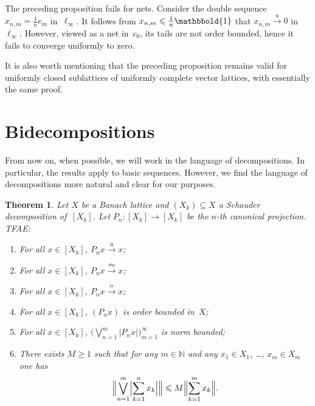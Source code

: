 \documentclass[12pt]{amsart}
\theoremstyle{plain}
\newtheorem{theorem}{Theorem}[section]
\theoremstyle{definition}
\newcommand{\abs}[1]{\lvert#1\rvert}
\newcommand{\Bigabs}[1]{\Bigl\lvert#1\Bigr\rvert}
\newcommand{\Bignorm}[1]{\Bigl\lVert#1\Bigr\rVert}
\newcommand{\goeso}{\xrightarrow{\mathrm{o}}}	%
\newcommand{\goesso}{\xrightarrow{\sigma\mathrm{o}}}	%
\newcommand{\goesu}{\xrightarrow{\mathrm{u}}} %
\def\one{\mathbbold{1}}
\renewcommand{\le}{\leqslant}
\renewcommand{\ge}{\geqslant}
\begin{document}
The preceding proposition fails for nets. Consider the double sequence
$x_{n,m}=\frac1n e_m$ in~$\ell_\infty$. It follows from
$x_{n,m}\le\frac1n\one$ that $x_{n,m}\goesu 0$
in~$\ell_\infty$. However, viewed as a net in~$c_0$, its tails are not
order bounded, hence it fails to converge uniformly to zero.

It is also worth mentioning that the preceding proposition remains
valid for uniformly closed sublattices of uniformly complete vector
lattices, with essentially the same proof.


\section{Bidecompositions}
\label{sec:bidec}


From now on, when possible, we will work in the language of
decompositions. In particular, the results apply to basic
sequences. However, we find the language of decompositions more
natural and clear for our purposes.

\begin{theorem}\label{decomp}
  Let $X$ be a Banach lattice and $(X_k)\subseteq X$ a Schauder
  decomposition of~$[X_k]$. Let $P_n\colon[X_k]\to[X_k]$ be the $n$-th
  canonical projection. TFAE:
  \begin{enumerate}
  \item\label{decomp-uconv} For all $x\in[X_k]$, $P_nx\goesu x$;
  \item\label{decomp-soconv} For all $x\in[X_k]$, $P_nx\goesso x$;
  \item\label{decomp-oconv} For all $x\in[X_k]$, $P_nx\goeso x$;
  \item\label{decomp-obdd} For all $x\in[X_k]$, $(P_nx)$ is order
    bounded in~$X$;
  \item\label{decomp-nbdd} For all $x\in[X_k]$,
    \begin{math}
      \bigl(\bigvee_{n=1}^m\abs{P_nx}\bigr)_{m=1}^\infty
    \end{math}
    is norm bounded;
  \item\label{decomp-ineq} There exists $M\ge 1$ such that for any
    $m\in\mathbb N$ and any $x_1\in X_1$, \dots, $x_m\in X_m$ one has
    \begin{equation}\label{bidec-ineq}
      \Bignorm{\bigvee\limits_{n=1}^m\Bigabs{\sum\limits_{k=1}^nx_k}}
      \le M\Bignorm{\sum_{k=1}^mx_k}.
    \end{equation}
  \end{enumerate}
\end{theorem}
\end{document}
